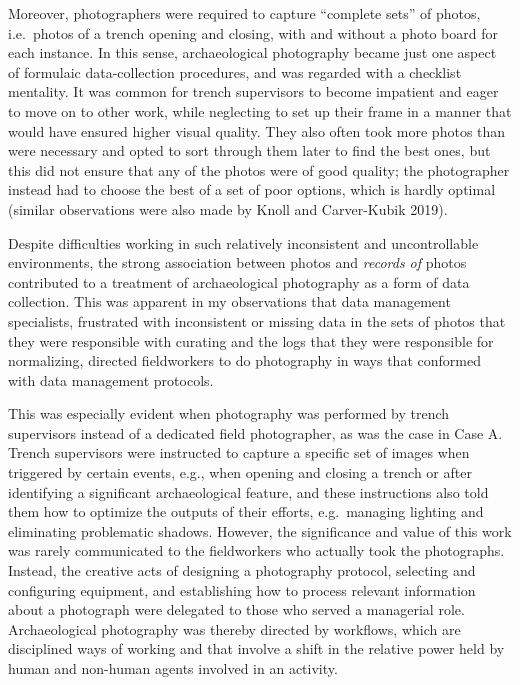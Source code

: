 \documentclass[
]{article}
\begin{document}
Moreover, photographers were required to capture ``complete sets'' of
photos, i.e.~photos of a trench opening and closing, with and without a
photo board for each instance. In this sense, archaeological photography
became just one aspect of formulaic data-collection procedures, and was
regarded with a checklist mentality. It was common for trench
supervisors to become impatient and eager to move on to other work,
while neglecting to set up their frame in a manner that would have
ensured higher visual quality. They also often took more photos than
were necessary and opted to sort through them later to find the best
ones, but this did not ensure that any of the photos were of good
quality; the photographer instead had to choose the best of a set of
poor options, which is hardly optimal (similar observations were also
made by Knoll and Carver-Kubik 2019).

Despite difficulties working in such relatively inconsistent and
uncontrollable environments, the strong association between photos and
\emph{records of} photos contributed to a treatment of archaeological
photography as a form of data collection. This was apparent in my
observations that data management specialists, frustrated with
inconsistent or missing data in the sets of photos that they were
responsible with curating and the logs that they were responsible for
normalizing, directed fieldworkers to do photography in ways that
conformed with data management protocols.

This was especially evident when photography was performed by trench
supervisors instead of a dedicated field photographer, as was the case
in Case A. Trench supervisors were instructed to capture a specific set
of images when triggered by certain events, e.g., when opening and
closing a trench or after identifying a significant archaeological
feature, and these instructions also told them how to optimize the
outputs of their efforts, e.g.~managing lighting and eliminating
problematic shadows. However, the significance and value of this work
was rarely communicated to the fieldworkers who actually took the
photographs. Instead, the creative acts of designing a photography
protocol, selecting and configuring equipment, and establishing how to
process relevant information about a photograph were delegated to those
who served a managerial role. Archaeological photography was thereby
directed by workflows, which are disciplined ways of working and that
involve a shift in the relative power held by human and non-human agents
involved in an activity.
\end{document}
